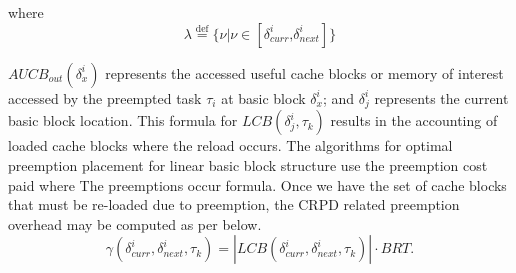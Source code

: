 %
%
\noindent
where
\begin{equation*}\label{eqn:lcb-formula-1b}
    \lambda \stackrel{\text{def}}{=} \{ \nu|\nu \in [ \delta_{curr}^{i} \text{,} \delta_{next}^{i} ] \}
\end{equation*}

\noindent
\begin{math}\textit{AUCB}_{out}(\delta_{x}^{i})\end{math} represents the accessed useful cache blocks or memory of interest accessed by the preempted task \begin{math}\tau_{i}\end{math} at basic block \begin{math}\delta_{x}^{i}\end{math}; and \begin{math}\delta_{j}^{i}\end{math} represents the current basic block location.  This formula for \begin{math}\textit{LCB}(\delta_{j}^{i},\tau_{k})\end{math} results in the accounting of loaded cache blocks where the reload occurs.  The algorithms for optimal preemption placement for linear basic block structure use the preemption cost paid where The preemptions occur formula.  Once we have the set of cache blocks that must be re-loaded due to preemption, the CRPD related preemption overhead may be computed as per below.
\begin{equation}\label{eqn:crpd-formula}
    \gamma(\delta_{curr}^{i},\delta_{next}^{i},\tau_{k}) = | \textit{LCB}(\delta_{curr}^{i},\delta_{next}^{i},\tau_{k}) | \cdot BRT.
\end{equation}

